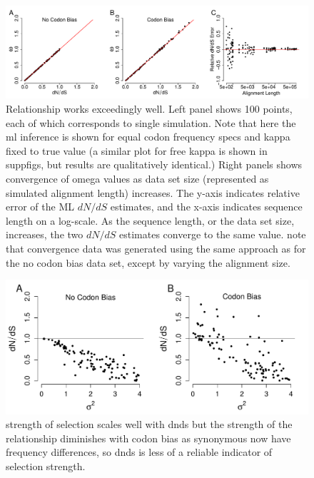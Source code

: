 \documentclass{pnastwo}
\begin{document}
\begin{figure}[H]
\centerline{\includegraphics[width=8in]{figures/MainText/regression_convergence.pdf}}
\caption{\label{reg_conv} Relationship works exceedingly well. Left panel shows 100 points, each of which corresponds to single simulation. Note that here the ml inference is shown for equal codon frequency specs and kappa fixed to true value (a similar plot for free kappa is shown in suppfigs, but results are qualitatively identical.) Right panels shows convergence of omega values as data set size (represented as simulated alignment length) increases. The y-axis indicates relative error of the ML $dN/dS$ estimates, and the x-axis indicates sequence length on a log-scale. As the sequence length, or the data set size, increases, the two $dN/dS$ estimates converge to the same value. note that convergence data was generated using the same approach as for the no codon bias data set, except by varying the alignment size.}
\end{figure}


\bigskip
\begin{figure}[H]
\centerline{\includegraphics[width=6in]{figures/MainText/sd_vs_dnds.pdf}}
\caption{\label{stddev_dnds} strength of selection scales well with dnds but the strength of the relationship diminishes with codon bias as synonymous now have frequency differences, so dnds is less of a reliable indicator of selection strength.}
\end{figure}
\end{document}
